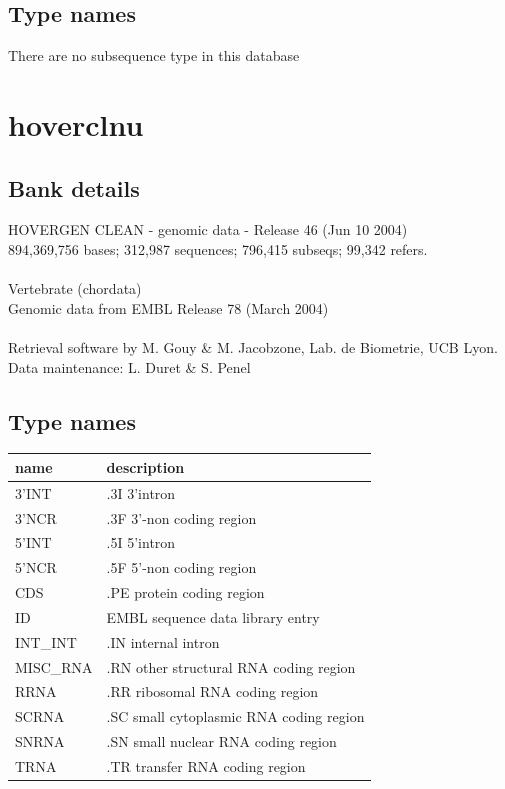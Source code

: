 \documentclass{article}
\begin{document}
\begin{Schunk}
\subsection{Type names}
There are no subsequence type in this database
\section{ hoverclnu }
\subsection{Bank details}
HOVERGEN CLEAN - genomic data - Release 46 (Jun 10 2004)\\
894,369,756 bases; 312,987 sequences; 796,415 subseqs; 99,342 refers.\\
\\
Vertebrate (chordata)\\
Genomic data from EMBL Release 78  (March 2004)\\
\\
Retrieval software by M. Gouy \& M. Jacobzone, Lab. de Biometrie, UCB Lyon.\\
Data maintenance: L. Duret \& S. Penel\\


\subsection{Type names}
\noindent\begin{tabular}{ll}
\hline \hline
name & description\\
\hline
3'INT & .3I 3'intron \\
3'NCR & .3F  3'-non coding region \\
5'INT & .5I 5'intron \\
5'NCR & .5F  5'-non coding region \\
CDS & .PE protein coding region \\
ID & EMBL sequence data library entry \\
INT\_INT & .IN  internal intron \\
MISC\_RNA & .RN other structural RNA coding region \\
RRNA & .RR ribosomal RNA coding region \\
SCRNA & .SC small cytoplasmic RNA coding region \\
SNRNA & .SN small nuclear RNA coding region \\
TRNA & .TR transfer RNA coding region \\
\hline \hline
\end{tabular}


\end{Schunk}
\end{document}
